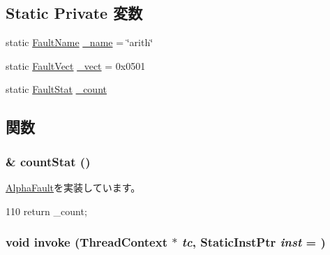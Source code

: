 \subsection*{Static Private 変数}
\begin{DoxyCompactItemize}
\item 
static \hyperlink{sim_2faults_8hh_abb196df64725e5c2568c900cf130d8d7}{FaultName} \hyperlink{classAlphaISA_1_1ArithmeticFault_ac79073ffcd2c66a09bcd3bd3ad206019}{\_\-name} = \char`\"{}arith\char`\"{}
\item 
static \hyperlink{classm5_1_1params_1_1Addr}{FaultVect} \hyperlink{classAlphaISA_1_1ArithmeticFault_ad9e5855b9db0b2824cf6c507be4a872e}{\_\-vect} = 0x0501
\item 
static \hyperlink{classStats_1_1Scalar}{FaultStat} \hyperlink{classAlphaISA_1_1ArithmeticFault_a4bff925c412f331c5aaf6a39b79619ff}{\_\-count}
\end{DoxyCompactItemize}


\subsection{関数}
\hypertarget{classAlphaISA_1_1ArithmeticFault_a6c79663c761ff57265459f7e3aefaf4c}{
\subsubsection[{countStat}]{\& countStat ()}}
\label{classAlphaISA_1_1ArithmeticFault_a6c79663c761ff57265459f7e3aefaf4c}


\hyperlink{classAlphaISA_1_1AlphaFault_a5d92ccd11b5cd6b04f02bd0a088b776c}{AlphaFault}を実装しています。


\begin{DoxyCode}
110 {return _count;}
\end{DoxyCode}
\hypertarget{classAlphaISA_1_1ArithmeticFault_a2bd783b42262278d41157d428e1f8d6f}{
\subsubsection[{invoke}]{\setlength{\rightskip}{0pt plus 5cm}void invoke ({\bf ThreadContext} $\ast$ {\em tc}, \/  {\bf StaticInstPtr} {\em inst} = {})}}
\label{classAlphaISA_1_1ArithmeticFault_a2bd783b42262278d41157d428e1f8d6f}


